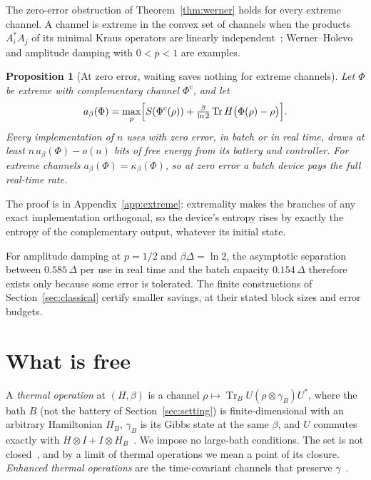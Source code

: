 \documentclass[11pt]{article}
\newtheorem{proposition}[theorem]{Proposition}
\theoremstyle{definition}
\theoremstyle{remark}
\newcommand{\Tr}{\operatorname{Tr}}
\newcommand{\Trt}{\kappa_\beta}
\begin{document}
The zero-error obstruction of Theorem~\ref{thm:werner} holds for every extreme channel. A channel is extreme in the convex set of channels when the products $A_i^*A_j$ of its minimal Kraus operators are linearly independent~\cite{Choi75}; Werner--Holevo and amplitude damping with $0<p<1$ are examples.

\begin{proposition}[At zero error, waiting saves nothing for extreme channels]\label{prop:extreme}
Let $\Phi$ be extreme with complementary channel $\Phi^c$, and let
\[
a_\beta(\Phi)=\max_\rho\Bigl[S(\Phi^c(\rho))+\tfrac{\beta}{\ln2}\Tr H\bigl(\Phi(\rho)-\rho\bigr)\Bigr].
\]
Every implementation of $n$ uses with zero error, in batch or in real time, draws at least $n\,a_\beta(\Phi)-o(n)$ bits of free energy from its battery and controller. For extreme channels $a_\beta(\Phi)=\Trt(\Phi)$, so at zero error a batch device pays the full real-time rate.
\end{proposition}

The proof is in Appendix~\ref{app:extreme}: extremality makes the branches of any exact implementation orthogonal, so the device's entropy rises by exactly the entropy of the complementary output, whatever its initial state.

For amplitude damping at $p=1/2$ and $\beta\Delta=\ln2$, the asymptotic separation between $0.585\,\Delta$ per use in real time and the batch capacity $0.154\,\Delta$ therefore exists only because some error is tolerated. The finite constructions of Section~\ref{sec:classical} certify smaller savings, at their stated block sizes and error budgets.

\section{What is free}\label{sec:free}

A \emph{thermal operation} at $(H,\beta)$ is a channel $\rho\mapsto\Tr_BU(\rho\otimes\gamma_B)U^*$, where the bath $B$ (not the battery of Section~\ref{sec:setting}) is finite-dimensional with an arbitrary Hamiltonian $H_B$, $\gamma_B$ is its Gibbs state at the same $\beta$, and $U$ commutes exactly with $H\otimes I+I\otimes H_B$~\cite{Janzing00,HorodeckiOppenheim13,Brandao13,vomEnde22,LieEtAl26}. We impose no large-bath conditions. The set is not closed~\cite{vomEnde22}, and by a limit of thermal operations we mean a point of its closure. \emph{Enhanced thermal operations} are the time-covariant channels that preserve $\gamma$~\cite{Cwiklinski15}.
\end{document}

